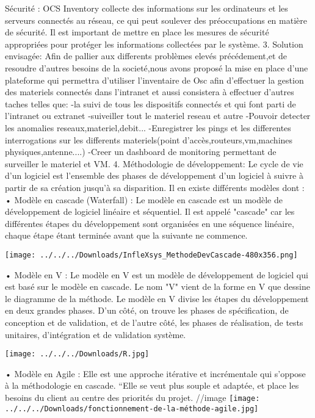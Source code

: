 \documentclass{report}
\begin{document}
Sécurité : OCS Inventory collecte des informations sur les ordinateurs et les serveurs connectés au réseau, ce qui peut soulever des préoccupations en matière de sécurité. Il est important de mettre en place les mesures de sécurité appropriées pour protéger les informations collectées par le système.
3. Solution envisagée:
Afin de pallier 	aux differents problèmes elevés précédement,et de resoudre d'autres besoins de la societé,nous avons proposé la mise en place d'une plateforme qui permettra d'utiliser l'inventaire de Osc afin d'effectuer la gestion des materiels connectés dans l'intranet et aussi consistera à effectuer d'autres taches telles que:
-la suivi de tous les dispositifs connectés et qui font parti de l'intranet ou extranet
-suiveiller tout le materiel reseau et autre
-Pouvoir detecter les anomalies reseaux,materiel,debit...
-Enregistrer les pings et les differentes interrogations sur les differents materiels(point d'accès,routeurs,vm,machines physiques,antenne....)
-Creer un dashboard de monitoring permettant de surveiller le materiel et VM.
4. Méthodologie de développement:
Le cycle de vie d’un logiciel est l’ensemble des phases de développement d’un logiciel à suivre
à partir de sa création jusqu’à sa disparition. Il en existe différents modèles dont :
• Modèle en cascade (Waterfall) : Le modèle en cascade est un modèle de développement de logiciel linéaire et séquentiel. Il est appelé "cascade" car les différentes étapes du développement sont organisées en une séquence linéaire, chaque étape étant terminée avant que la suivante ne commence.
 
\texttt{[image: ../../../Downloads/InfleXsys\_MethodeDevCascade-480x356.png]} 

• Modèle en V :
Le modèle en V est un modèle de développement de logiciel qui est basé sur le modèle en cascade. Le nom "V" vient de la forme en V que dessine le diagramme de la méthode.
Le modèle en V divise les étapes du développement en deux grandes phases. D'un côté, on trouve les phases de spécification, de conception et de validation, et de l'autre côté, les phases de réalisation, de tests unitaires, d'intégration et de validation système.

\texttt{[image: ../../../Downloads/R.jpg]}
 
• Modèle en Agile :
Elle est une approche itérative et incrémentale qui s'oppose à la 
méthodologie en cascade. “Elle se veut plus souple et adaptée, et place les besoins du 
client au centre des priorités du projet.
//image
\texttt{[image: ../../../Downloads/fonctionnement-de-la-méthode-agile.jpg]} 
\end{document}
